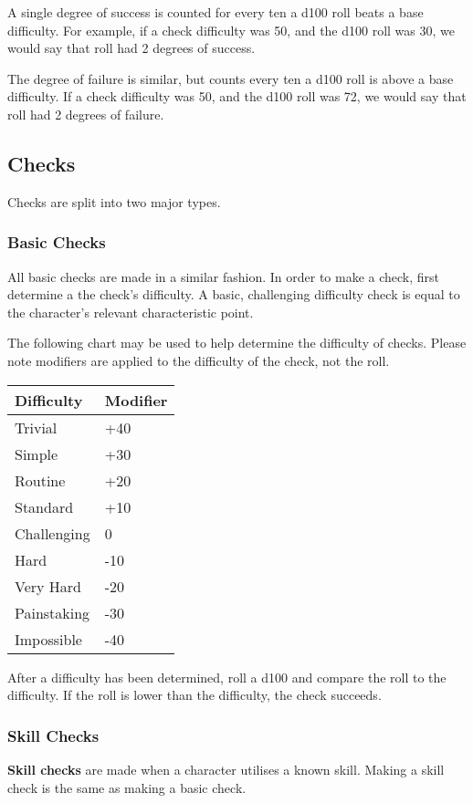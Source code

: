 \documentclass[]{article}
\begin{document}
A single degree of success is counted for every ten a d100 roll beats a
base difficulty. For example, if a check difficulty was 50, and the d100
roll was 30, we would say that roll had 2 degrees of success.

The degree of failure is similar, but counts every ten a d100 roll is
above a base difficulty. If a check difficulty was 50, and the d100 roll
was 72, we would say that roll had 2 degrees of failure.

\subsection{Checks}\label{checks}

Checks are split into two major types.

\subsubsection{Basic Checks}\label{basic-checks}

All basic checks are made in a similar fashion. In order to make a
check, first determine a the check's difficulty. A basic, challenging
difficulty check is equal to the character's relevant characteristic
point.

The following chart may be used to help determine the difficulty of
checks. Please note modifiers are applied to the difficulty of the
check, not the roll.

\begin{longtable}[]{@{}ll@{}}
\toprule
Difficulty & Modifier\tabularnewline
\midrule
\endhead
Trivial & +40\tabularnewline
Simple & +30\tabularnewline
Routine & +20\tabularnewline
Standard & +10\tabularnewline
Challenging & 0\tabularnewline
Hard & -10\tabularnewline
Very Hard & -20\tabularnewline
Painstaking & -30\tabularnewline
Impossible & -40\tabularnewline
\bottomrule
\end{longtable}

After a difficulty has been determined, roll a d100 and compare the roll
to the difficulty. If the roll is lower than the difficulty, the check
succeeds.

\subsubsection{Skill Checks}\label{skill-checks}

\textbf{Skill checks} are made when a character utilises a known skill.
Making a skill check is the same as making a basic check.
\end{document}

